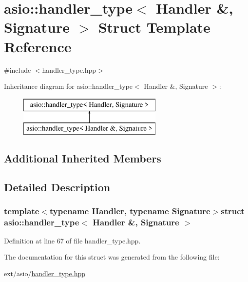\hypertarget{structasio_1_1handler__type_3_01_handler_01_6_00_01_signature_01_4}{}\section{asio\+:\+:handler\+\_\+type$<$ Handler \&, Signature $>$ Struct Template Reference}
\label{structasio_1_1handler__type_3_01_handler_01_6_00_01_signature_01_4}


{\ttfamily \#include $<$handler\+\_\+type.\+hpp$>$}

Inheritance diagram for asio\+:\+:handler\+\_\+type$<$ Handler \&, Signature $>$\+:\begin{figure}[H]
\begin{center}
\leavevmode
\includegraphics[height=2.000000cm]{structasio_1_1handler__type_3_01_handler_01_6_00_01_signature_01_4}
\end{center}
\end{figure}
\subsection*{Additional Inherited Members}


\subsection{Detailed Description}
\subsubsection*{template$<$typename Handler, typename Signature$>$struct asio\+::handler\+\_\+type$<$ Handler \&, Signature $>$}



Definition at line 67 of file handler\+\_\+type.\+hpp.



The documentation for this struct was generated from the following file\+:\begin{DoxyCompactItemize}
\item 
ext/asio/\hyperlink{handler__type_8hpp}{handler\+\_\+type.\+hpp}\end{DoxyCompactItemize}
